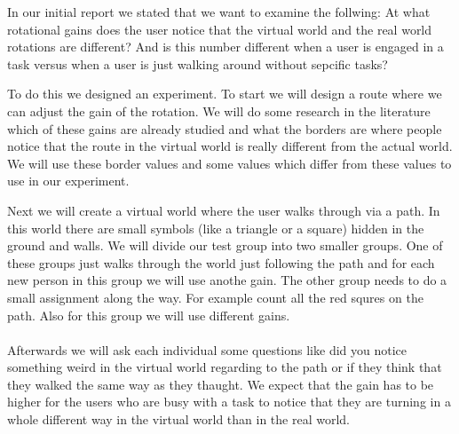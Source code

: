 In our initial report we stated that we want to examine the follwing: At what rotational gains does the user notice that the virtual world and the real world rotations are different? And is this number different when a user is engaged in a task versus when a user is just walking around without sepcific tasks?

To do this we designed an experiment. To start we will design a route where we can adjust the gain of the rotation. We will do some research in the literature which of these gains are already studied and what the borders are where people notice that the route in the virtual world is really different from the actual world. We will use these border values and some values which differ from these values to use in our experiment.

Next we will create a virtual world where the user walks through via a path. In this world there are small symbols (like a triangle or a square) hidden in the ground and walls. We will divide our test group into two smaller groups. One of these groups just walks through the world just following the path and for each new person in this group we will use anothe gain. The other group needs to do a small assignment along the way. For example count all the red squres on the path. Also for this group we will use different gains.
\\
\\
Afterwards we will ask each individual some questions like did you notice something weird in the virtual world regarding to the path or if they think that they walked the same way as they thaught. We expect that the gain has to be higher for the users who are busy with a task to notice that they are turning in a whole different way in the virtual world than in the real world.